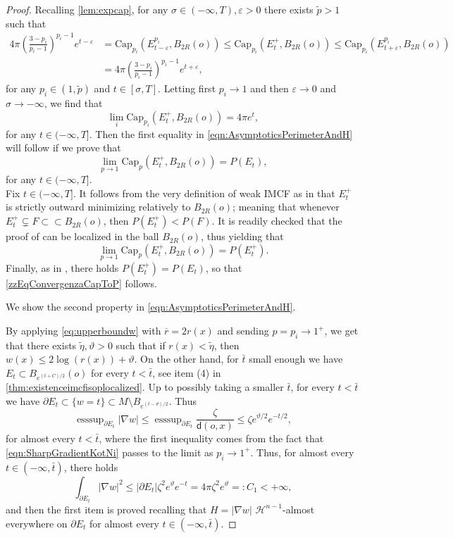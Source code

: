 \documentclass[a4paper,12pt,reqno]{amsart}
\numberwithin{equation}{section}
\theoremstyle{plain}
\theoremstyle{definition}
\theoremstyle{remark}
\newcommand{\eps}{\varepsilon}
\newcommand{\dist}{\mathsf{d}}
\DeclareMathOperator{\esssup}{ess sup}
\begin{document}
{\begin{proof}
Recalling \cref{lem:expcap}, for  any $\sigma \in (-\infty,T), \eps>0$ there exists $\tilde p>1$ such that
\[
\begin{split}
4\pi\left( \frac{3-p_i}{p_i-1} \right)^{p_i-1}e^{t-\eps}
&=
\mathrm{Cap}_{p_i}(E^{p_i}_{t-\eps} , B_{2R}(o)) \le \mathrm{Cap}_{p_i}(E_t^+ , B_{2R}(o)) \le \mathrm{Cap}_{p_i}(E^{p_i}_{t+\eps} , B_{2R}(o))
\\&
=
4\pi\left( \frac{3-{p_i}}{{p_i}-1} \right)^{{p_i}-1}e^{t+\eps},
\end{split}
\]
for any $p_i \in (1,\tilde p)$ and $t \in [\sigma, T]$. Letting first $p_i\to 1$ and then $\eps\to0$ and $\sigma\to-\infty$, we find that
\[
\lim_{i} \mathrm{Cap}_{p_i}(E_t^+ , B_{2R}(o)) = 4\pi e^t,
\]
for any $t \in (-\infty, T]$. Then the first equality in \eqref{eqn:AsymptoticsPerimeterAndH} will follow if we prove that
\begin{equation}\label{zzEqConvergenzaCapToP}
    \lim_{p\to 1} \mathrm{Cap}_p(E_t^+ , B_{2R}(o)) = P (E_t),
\end{equation}
for any $t \in (-\infty, T]$.\\
Fix $t \in (-\infty, T]$. It follows from the very definition of weak IMCF as in \cite[Minimizing Hull Property 1.4]{HuiskenIlmanen} that $E_t^+$ is strictly outward minimizing relatively to $B_{2R}(o)$; meaning that whenever $E_t^+ \subsetneq F \subset\subset B_{2R}(o)$, then $P(E_t^+) < P(F)$. It is readily checked that the proof of \cite[Theorem 1.2]{FogagnoloMazzieriHulls} can be localized in the ball $B_{2R}(o)$, thus yielding that
\[
\lim_{p\to 1} \mathrm{Cap}_p(E_t^+ , B_{2R}(o)) = P (E_t^+).
\]
Finally, as in \cite[Minimizing Hull Property 1.4(iv)]{HuiskenIlmanen}, there holds $P(E_t^+)=P(E_t)$, so that \eqref{zzEqConvergenzaCapToP} follows.
            

We show the second property in \eqref{eqn:AsymptoticsPerimeterAndH}.{ By applying \eqref{eq:upperboundw} with $\overline{r}=2r(x)$ and sending $p=p_i\to 1^+$, we get that there exists $\tilde \eta, \vartheta>0$ such that if $r(x)<\tilde\eta$, then $w(x)\leq 2\log (r(x))+\vartheta$. On the other hand, for $\bar t$ small enough we have $E_t \subset B_{e^{(t+C)/2}}(o)$
        for every $t<\bar t$, see 
        item (4) in \cref{thm:existenceimcfisoplocalized}. Up to possibly taking a smaller $\bar t$, for every $t<\bar t$ we have $\partial E_t \subset\{w=t\}\subset M\setminus B_{e^{(t-\vartheta)/2}}$.
        Thus
        \[
        \esssup_{\partial E_t} |\nabla w| \leq \esssup_{\partial E_t}\frac{\zeta}{\dist(o,x)} \leq \zeta e^{\vartheta/2} e^{-t/2},
        \]
        for almost every $t<\bar t$, where the first inequality comes from the fact that \eqref{eqn:SharpGradientKotNi} passes to the limit as $p_i\to 1^+$. Thus, for almost every $t\in (-\infty,\bar t)$, there holds
        \[
        \int_{\partial E_t} |\nabla w|^2\leq |\partial E_t|\zeta^2e^{\vartheta}e^{-t}=4\pi\zeta^2 e^{\vartheta}=:C_1 < +\infty,
        \]
        and then the first item is proved recalling that $H=|\nabla w|$ $\mathcal{H}^{n-1}$-almost everywhere on $\partial E_t$ for almost every $t\in (-\infty,\bar t)$.

}
\end{proof}}
\end{document}
